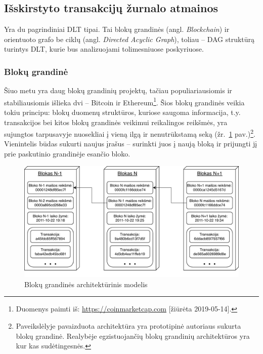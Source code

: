 \subsection{Išskirstyto transakcijų žurnalo atmainos} \label{subsection:dlt-types}

Yra du pagrindiniai DLT tipai. Tai blokų grandinės (angl. \textit{Blockchain}) ir orientuoto grafo be ciklų (angl. \textit{Directed Acyclic Graph}), toliau – DAG struktūrą turintys DLT, kurie bus analizuojami tolimesniuose poskyriuose.




\subsubsection{Blokų grandinė} \label{subsection:blockchain}

Šiuo metu yra daug blokų grandinių projektų, tačiau populiariausiomis ir stabiliausiomis išlieka dvi – Bitcoin ir Ethereum\footnote{Duomenys paimti iš: \href{https://coinmarketcap.com}{https://coinmarketcap.com} [žiūrėta 2019-05-14].}. Šios blokų grandinės veikia tokiu principu: blokų duomenų struktūros, kuriose saugoma informacija, t.y. transakcijos bei kitos blokų grandinės veikimui reikalingos reikšmės, yra sujungtos tarpusavyje nuosekliai į vieną ilgą ir nenutrūkstamą seką (žr.~\ref{img:6} pav.)\footnote{Paveikslėlyje pavaizduota architektūra yra prototipinė autoriaus sukurta blokų grandinė. Realybėje egzistuojančių blokų grandinių architektūros yra kur kas sudėtingesnės.}. Vienintelis būdas sukurti naujus įrašus – surinkti juos į naują bloką ir prijungti jį prie paskutinio grandinėje esančio bloko.

\begin{figure}[H]
    \centering
    \includegraphics[scale=0.80]{images/block-chain-architecture}
    \caption{Blokų grandinės architektūrinis modelis}
    \label{img:6}
\end{figure}



